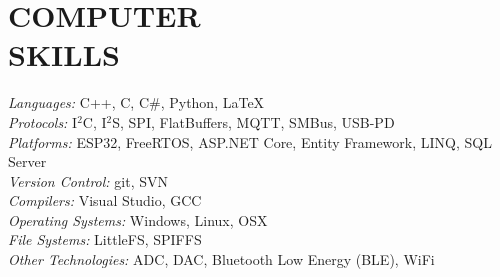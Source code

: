 \section{COMPUTER \\ SKILLS}
	{\sl Languages:} C++, C, C\#, Python, \LaTeX\\
	{\sl Protocols:} I$^2$C, I$^2$S, SPI, FlatBuffers, MQTT, SMBus, USB-PD\\
	{\sl Platforms:} ESP32, FreeRTOS, ASP.NET Core, Entity Framework, LINQ, SQL Server\\
	{\sl Version Control:} git, SVN\\
	{\sl Compilers:} Visual Studio, GCC\\
	{\sl Operating Systems:} Windows, Linux, OSX\\
	{\sl File Systems:} LittleFS, SPIFFS\\
	{\sl Other Technologies:} ADC, DAC, Bluetooth Low Energy (BLE), WiFi\\
